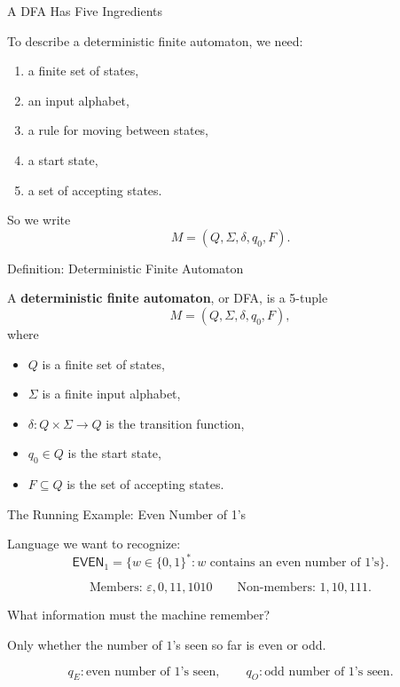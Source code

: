 \documentclass[10pt,aspectratio=169]{beamer}
\newcommand{\eps}{\varepsilon}
\newcommand{\lang}[1]{\mathsf{#1}}
\newcommand{\dfa}{M=(Q,\Sigma,\delta,q_0,F)}
\begin{document}
\begin{frame}{A DFA Has Five Ingredients}

To describe a deterministic finite automaton, we need:


\begin{enumerate}
\item a finite set of states,
\item an input alphabet,
\item a rule for moving between states,
\item a start state,
\item a set of accepting states.
\end{enumerate}


So we write
\[
\dfa.
\]

\end{frame}

\begin{frame}{Definition: Deterministic Finite Automaton}

A \textbf{deterministic finite automaton}, or DFA, is a 5-tuple
\[
M=(Q,\Sigma,\delta,q_0,F),
\]
where

\begin{itemize}
\item $Q$ is a finite set of states,
\item $\Sigma$ is a finite input alphabet,
\item $\delta:Q\times\Sigma\rightarrow Q$ is the transition function,
\item $q_0\in Q$ is the start state,
\item $F\subseteq Q$ is the set of accepting states.
\end{itemize}

\end{frame}

\begin{frame}{The Running Example: Even Number of 1's}

Language we want to recognize:
\[
\lang{EVEN}_1=\{w\in\{0,1\}^*: w\text{ contains an even number of }1\text{'s}\}.
\]

\[
\text{Members: }\eps,0,11,1010
\qquad
\text{Non-members: }1,10,111.
\]


What information must the machine remember?


Only whether the number of $1$'s seen so far is even or odd.

\[
q_E: \text{even number of }1\text{'s seen},
\qquad
q_O: \text{odd number of }1\text{'s seen}.
\]

\end{frame}
\end{document}
